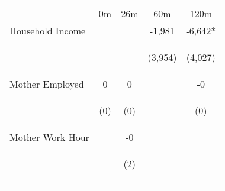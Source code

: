 \begin{tabular}{lcccc}
\hline \noalign{\smallskip} & 0m & 26m & 60m & 120m\\
\noalign{\smallskip}\hline \noalign{\smallskip}Household Income &  &  & -1,981 & -6,642*\\
 & \begin{footnotesize}\end{footnotesize} & \begin{footnotesize}\end{footnotesize} & \begin{footnotesize}(3,954)\end{footnotesize} & \begin{footnotesize}(4,027)\end{footnotesize}\\
\noalign{\smallskip}Mother Employed & 0 & 0 &  & -0\\
 & \begin{footnotesize}(0)\end{footnotesize} & \begin{footnotesize}(0)\end{footnotesize} & \begin{footnotesize}\end{footnotesize} & \begin{footnotesize}(0)\end{footnotesize}\\
\noalign{\smallskip}Mother Work Hour &  & -0 &  & \\
 & \begin{footnotesize}\end{footnotesize} & \begin{footnotesize}(2)\end{footnotesize} & \begin{footnotesize}\end{footnotesize} & \begin{footnotesize}\end{footnotesize}\\
\noalign{\smallskip}\hline\end{tabular}\\
